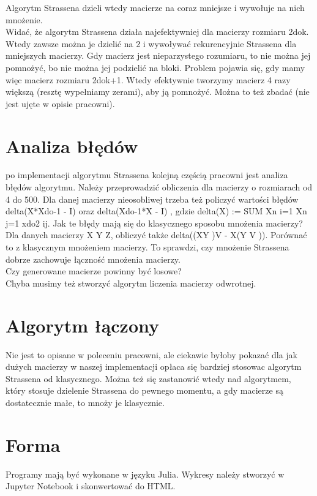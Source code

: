 \documentclass[paper=a4, fontsize=11pt]{scrartcl} %
\numberwithin{equation}{section} %
\numberwithin{figure}{section} %
\numberwithin{table}{section} %
\begin{document}
Algorytm Strassena dzieli wtedy macierze na coraz mniejsze i wywołuje na nich mnożenie. \\

Widać, że algorytm Strassena działa najefektywniej dla macierzy rozmiaru 2dok. Wtedy zawsze można je dzielić na 2 i wywoływać rekurencyjnie Strassena dla mniejszych macierzy. Gdy macierz jest nieparzystego rozumiaru, to nie można jej pomnożyć, bo nie można jej podzielić na bloki. Problem pojawia się, gdy mamy więc macierz rozmiaru 2dok+1. Wtedy efektywnie tworzymy macierz 4 razy większą (resztę wypełniamy zerami), aby ją pomnożyć. Można to też zbadać (nie jest ujęte w opisie pracowni).


\section{Analiza błędów}
po implementacji algorytmu Strassena kolejną częścią pracowni jest analiza błędów algorytmu.
Należy przeprowadzić obliczenia dla macierzy o rozmiarach od 4 do 500. Dla danej macierzy nieosobliwej trzeba też policzyć wartości błędów delta(X*Xdo-1 - I) oraz delta(Xdo-1*X - I) , gdzie 
delta(X) := SUM Xn i=1 Xn j=1 xdo2 ij. Jak te błędy mają się do klasycznego sposobu mnożenia macierzy?\\

Dla danych macierzy X Y Z, obliczyć także delta((XY )V - X(Y V )). Porównać to z klasycznym mnożeniem macierzy. To sprawdzi, czy mnożenie Strassena dobrze zachowuje łączność mnożenia macierzy.\\

Czy generowane macierze powinny być losowe?\\
Chyba musimy też stworzyć algorytm liczenia macierzy odwrotnej.

\section{Algorytm łączony}
Nie jest to opisane w poleceniu pracowni, ale ciekawie byłoby pokazać dla jak dużych macierzy w naszej implementacji opłaca się bardziej stosowac algorytm Strassena od klasycznego. Można też się zastanowić wtedy nad algorytmem, który stosuje dzielenie Strassena do pewnego momentu, a gdy macierze są dostatecznie małe, to mnoży je klasycznie.

\section{Forma}
Programy mają być wykonane w języku Julia. Wykresy należy stworzyć w Jupyter Notebook i skonwertować do HTML. 
\end{document}
